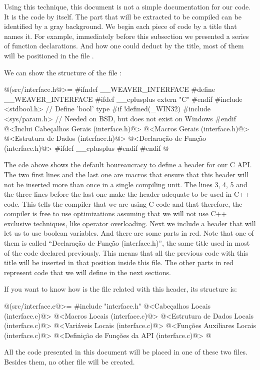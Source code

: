 Using this technique, this document is not a simple documentation for
our code. It is the code by itself. The part that will be extracted to
be compiled can be identified by a gray background. We begin each
piece of code by a title that names it. For example, immediately
before this subsection we presented a series of function
declarations. And how one could deduct by the title, most of them will
be positioned in the file .

We can show the structure of the file :

\iniciocodigo
@(src/interface.h@>=
#ifndef __WEAVER_INTERFACE
#define __WEAVER_INTERFACE
#ifdef __cplusplus
extern "C" {
#endif
#include <stdbool.h> // Define  'bool' type
#if !defined(_WIN32)
#include <sys/param.h> // Needed on BSD, but does not exist on Windows
#endif  
@<Inclui Cabeçalhos Gerais (interface.h)@>
@<Macros Gerais (interface.h)@>
@<Estrutura de Dados (interface.h)@>
@<Declaração de Função (interface.h)@>
#ifdef __cplusplus
}
#endif
#endif
@
\fimcodigo

The cde above shows the default boureaucracy to define a header for
our C API. The two first lines and the last one are macros that ensure
that this header will not be inserted more than once in a single
compiling unit. The lines 3, 4, 5 and the three lines before the last
one make the header adequate to be used in C++ code. This tells the
compiler that we are using C code and that therefore, the compiler is
free to use optimizations assuming that we will not use C++ exclusive
techniques, like operator overloading. Next we include a header that
will let us to use boolean variables. And there are some parts in
red. Note that one of them is called ``Declaração de Função
(interface.h)'', the same title used in most of the code declared
previously. This means that all the previous code with this title will
be inserted in that position inside this file. The other parts in red
represent code that we will define in the next sections.

If you want to know how is the  file related
with this header, its structure is:

\iniciocodigo
@(src/interface.c@>=
#include "interface.h"
@<Cabeçalhos Locais (interface.c)@>
@<Macros Locais (interface.c)@>
@<Estrutura de Dados Locais (interface.c)@>
@<Variáveis Locais (interface.c)@>
@<Funções Auxiliares Locais (interface.c)@>
@<Definição de Funções da API (interface.c)@>
@
\fimcodigo

All the code presented in this document will be placed in one of these
two files. Besides them, no other file will be created.

